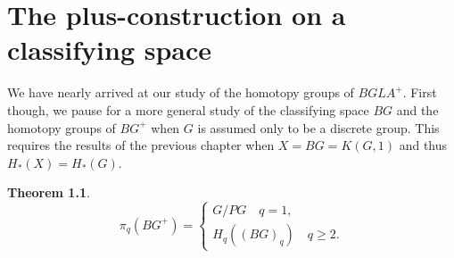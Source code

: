 \documentclass[openany,leqno]{book}  %
\newtheorem{theorem}{Theorem}[chapter]
\begin{document}

\chapter{The plus-construction on a classifying space} %
\label{cha:8the_plus_construction_on_a_classifying_space}
We have nearly arrived at our study of the homotopy groups of $BGLA^+$. First though, we pause for a more general study of the classifying space $BG$ and the homotopy groups of $BG^+$ when $G$ is assumed only to be a discrete group. This requires the results of the previous chapter when $X = BG = K(G, 1)$ and thus $H_*(X) = H_*(G)$.
\begin{theorem}
\begin{equation*}
\pi_q(BG^+)=
  \begin{cases}
G/PG \quad q=1, \\
H_q((BG)_q) \quad q\geqslant 2.
\end{cases}
\end{equation*}
\end{theorem}
\end{document}
